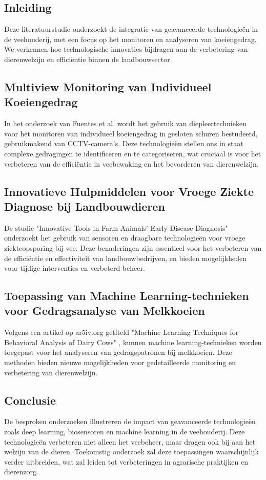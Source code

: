 \subsection*{Inleiding}
Deze literatuurstudie onderzoekt de integratie van geavanceerde technologieën in de veehouderij, met een focus op het monitoren en analyseren van koeiengedrag. We verkennen hoe technologische innovaties bijdragen aan de verbetering van dierenwelzijn en efficiëntie binnen de landbouwsector.
\subsection*{Multiview Monitoring van Individueel Koeiengedrag}
In het onderzoek van Fuentes et al. \autocite{Fuentes2023} wordt het gebruik van diepleertechnieken voor het monitoren van individueel koeiengedrag in gesloten schuren bestudeerd, gebruikmakend van CCTV-camera's. Deze technologieën stellen ons in staat complexe gedragingen te identificeren en te categoriseren, wat cruciaal is voor het verbeteren van de efficiëntie in veebewaking en het bevorderen van dierenwelzijn.
\subsection*{Innovatieve Hulpmiddelen voor Vroege Ziekte Diagnose bij Landbouwdieren}
De studie "Innovative Tools in Farm Animals’ Early Disease Diagnosis" \autocite{Animals13780} onderzoekt het gebruik van sensoren en draagbare technologieën voor vroege ziekteopsporing bij vee. Deze benaderingen zijn essentieel voor het verbeteren van de efficiëntie en effectiviteit van landbouwbedrijven, en bieden mogelijkheden voor tijdige interventies en verbeterd beheer.

\subsection*{Toepassing van Machine Learning-technieken voor Gedragsanalyse van Melkkoeien}
Volgens een artikel op ar5iv.org getiteld "Machine Learning Techniques for Behavioral Analysis of Dairy Cows" \autocite{ar5iv2021}, kunnen machine learning-technieken worden toegepast voor het analyseren van gedragspatronen bij melkkoeien. Deze methoden bieden nieuwe mogelijkheden voor gedetailleerde monitoring en verbetering van dierenwelzijn.

\subsection*{Conclusie}
De besproken onderzoeken illustreren de impact van geavanceerde technologieën zoals deep learning, biosensoren en machine learning in de veehouderij. Deze technologieën verbeteren niet alleen het veebeheer, maar dragen ook bij aan het welzijn van de dieren. Toekomstig onderzoek zal deze toepassingen waarschijnlijk verder uitbreiden, wat zal leiden tot verbeteringen in agrarische praktijken en dierenzorg.